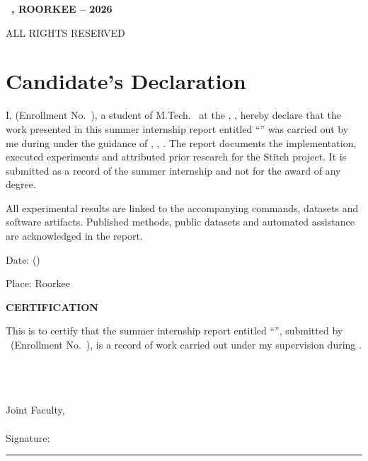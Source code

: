 \clearpage{}\hypersetup{pageanchor=true}
\thispagestyle{empty}\null\vfill
\begin{center}\bfseries
\textcopyright\ \InstituteUppercase, ROORKEE -- 2026\par
\vspace{8pt} ALL RIGHTS RESERVED
\end{center}
\vfill\null\clearpage

\chapter*{Candidate's Declaration}
I, \textbf{\StudentName} (Enrollment No.\ \EnrollmentNumber), a student of M.Tech.\ \ProgrammeName{} at the
\SchoolName, \InstituteName, hereby declare that the work presented in this summer internship
report entitled ``\textbf{\StitchFullTitle}'' was carried out by me during \InternshipPeriod{} under
the guidance of \SupervisorName, \SupervisorDepartment, \InstituteName. The report documents
the implementation, executed experiments and attributed prior research for the Stitch project.
It is submitted as a record of the summer internship and not for the award of any degree.

All experimental results are linked to the accompanying commands, datasets and software artifacts.
Published methods, public datasets and automated assistance are acknowledged in the report.

\vspace{8pt}
\noindent Date: \ReportDate\hfill (\StudentName)\par
\noindent Place: Roorkee\par
\vspace{13pt}
\begin{center}\bfseries CERTIFICATION\end{center}
This is to certify that the summer internship report entitled ``\StitchFullTitle'', submitted by
\StudentName\ (Enrollment No.\ \EnrollmentNumber), is a record of work carried out under my
supervision during \InternshipPeriod.

\vspace{10pt}
\begin{flushright}
\textbf{\SupervisorName}\\
\SupervisorDesignation\\
\SupervisorDepartment\\
Joint Faculty, \SchoolName\\
\InstituteName\\[8pt]
Signature: \rule{3cm}{.3pt}
\end{flushright}
\clearpage

